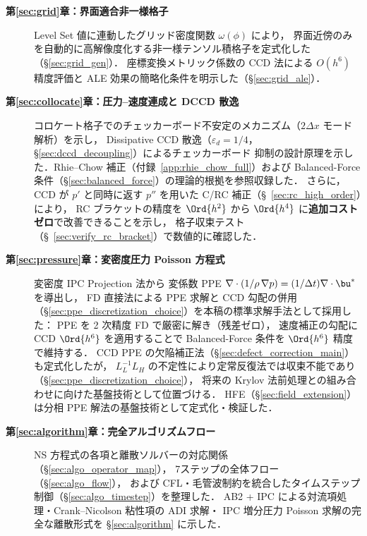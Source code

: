 \begin{description}
  \item[\textbf{第\ref{sec:grid}章：界面適合非一様格子}]
        Level Set 値に連動したグリッド密度関数 $\omega(\phi)$ により，
        界面近傍のみを自動的に高解像度化する非一様テンソル積格子を定式化した（§\ref{sec:grid_gen}）．
        座標変換メトリック係数の CCD 法による $O(h^6)$ 精度評価と
        ALE 効果の簡略化条件を明示した（§\ref{sec:grid_ale}）．

  \item[\textbf{第\ref{sec:collocate}章：圧力--速度連成と DCCD 散逸}]
        コロケート格子でのチェッカーボード不安定のメカニズム（$2\Delta x$ モード解析）を示し，
        Dissipative CCD 散逸（$\varepsilon_d=1/4$，§\ref{sec:dccd_decoupling}）によるチェッカーボード
        抑制の設計原理を示した．Rhie--Chow 補正（付録~\ref{app:rhie_chow_full}）および
        Balanced-Force 条件（§\ref{sec:balanced_force}）の理論的根拠を参照収録した．
        さらに，CCD が $p'$ と同時に返す $p''$ を用いた C/RC 補正（§~\ref{sec:rc_high_order}）により，
        RC ブラケットの精度を $\Ord{h^2}$ から $\Ord{h^4}$ に\textbf{追加コストゼロ}で改善できることを示し，
        格子収束テスト（§~\ref{sec:verify_rc_bracket}）で数値的に確認した．

  \item[\textbf{第\ref{sec:pressure}章：変密度圧力 Poisson 方程式}]
        変密度 IPC Projection 法から
        変係数 PPE $\nabla\cdot(1/\rho\,\nabla p) = (1/\Delta t)\nabla\cdot\bu^*$ を導出し，
        FD 直接法による PPE 求解と CCD 勾配の併用
        （§\ref{sec:ppe_discretization_choice}）を本稿の標準求解手法として採用した：
        PPE を 2 次精度 FD で厳密に解き（残差ゼロ），
        速度補正の勾配に CCD $\Ord{h^6}$ を適用することで
        Balanced-Force 条件を $\Ord{h^6}$ 精度で維持する．
        CCD PPE の欠陥補正法（§\ref{sec:defect_correction_main}）も定式化したが，
        $L_L^{-1} L_H$ の不定性により定常反復法では収束不能であり
        （§\ref{sec:ppe_discretization_choice}），
        将来の Krylov 法前処理との組み合わせに向けた基盤技術として位置づける．
        HFE（§\ref{sec:field_extension}）は分相 PPE 解法の基盤技術として定式化・検証した．

  \item[\textbf{第\ref{sec:algorithm}章：完全アルゴリズムフロー}]
        NS 方程式の各項と離散ソルバーの対応関係（§\ref{sec:algo_operator_map}），
        7ステップの全体フロー（§\ref{sec:algo_flow}），
        および CFL・毛管波制約を統合したタイムステップ制御（§\ref{sec:algo_timestep}）を整理した．
        AB2 + IPC による対流項処理・Crank--Nicolson 粘性項の ADI 求解・
        IPC 増分圧力 Poisson 求解の完全な離散形式を §\ref{sec:algorithm} に示した．
\end{description}

